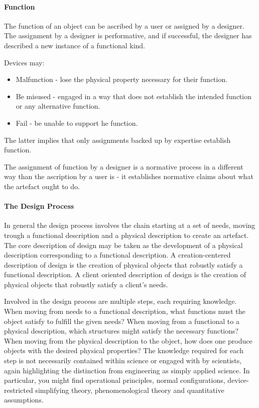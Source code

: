 \paragraph{Function}
The function of an object can be ascribed by a user or assigned by a designer. The assignment by a designer is performative, and if successful, the designer has described a new instance of a functional kind.

Devices may:
\begin{itemize}
	\item Malfunction - lose the physical property necessary for their function.
	\item Be misused - engaged in a way that does not establish the intended function or any alternative function.
	\item Fail - be unable to support he function.
\end{itemize}
The latter implies that only assignments backed up by expertise establish function.

The assignment of function by a designer is a normative process in a different way than the ascription by a user is - it establishes normative claims about what the artefact ought to do.

\paragraph{The Design Process}
In general the design process involves the chain starting at a set of needs, moving trough a functional description and a physical description to create an artefact. The core description of design may be taken as the development of a physical description corresponding to a functional description. A creation-centered description of design is the creation of physical objects that robustly satisfy a functional description. A client oriented description of design is the creation of physical objects that robustly satisfy a client's needs.

Involved in the design process are multiple steps, each requiring knowledge. When moving from needs to a functional description, what functions must the object satisfy to fulfill the given needs? When moving from a functional to a physical description, which structures might satisfy the necessary functions? When moving from the physical description to the object, how does one produce objects with the desired physical properties? The knowledge required for each step is not necessarily contained within science or engaged with by scientists, again highlighting the distinction from engineering as simply applied science. In particular, you might find operational principles, normal configurations, device-restricted simplifying theory, phenomenological theory and quantitative assumptions.

